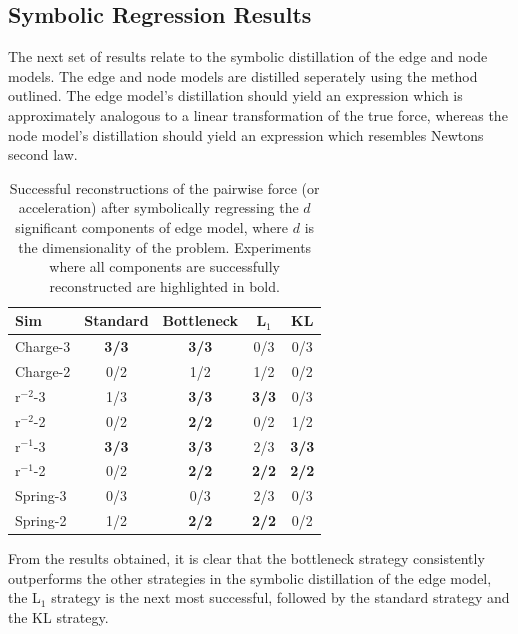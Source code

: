 \documentclass[11pt]{article}
\begin{document}
\subsection{Symbolic Regression Results}
The next set of results relate to the symbolic distillation of the edge and node models. The edge and node models are distilled seperately using the method outlined. The edge model's distillation should yield an expression which is approximately analogous to a linear transformation of the true force, whereas the node model's distillation should yield an expression which resembles Newtons second law.
\begin{table}[H]
        \centering
        \begin{tabular}{lcccc}
        \hline
        Sim & Standard & Bottleneck & L$_1$ & KL \\
        \hline
        Charge-3 & \textbf{3/3} & \textbf{3/3} & 0/3 & 0/3 \\
        Charge-2 & 0/2 & 1/2 & 1/2 & 0/2 \\
        r$^{-2}$-3 & 1/3 & \textbf{3/3} & \textbf{3/3} & 0/3 \\
        r$^{-2}$-2 & 0/2 & \textbf{2/2} & 0/2 & 1/2 \\
        r$^{-1}$-3 & \textbf{3/3} & \textbf{3/3} & 2/3 & \textbf{3/3} \\
        r$^{-1}$-2 & 0/2 & \textbf{2/2} & \textbf{2/2} & \textbf{2/2} \\
        Spring-3 & 0/3 & 0/3 & 2/3  & 0/3 \\
        Spring-2 & 1/2 & \textbf{2/2} & \textbf{2/2} & 0/2 \\
        \hline
        \end{tabular}
        \caption{Successful reconstructions of the pairwise force (or acceleration) after symbolically regressing the $d$ significant components of edge model, where $d$ is the dimensionality of the problem. Experiments where all components are successfully reconstructed are highlighted in bold.}
        \label{tab:sr_edge_model_table}
    \end{table}
From the results obtained, it is clear that the bottleneck strategy consistently outperforms the other strategies in the symbolic distillation of the edge model, the L$_1$ strategy is the next most successful, followed by the standard strategy and the KL strategy.
\end{document}
